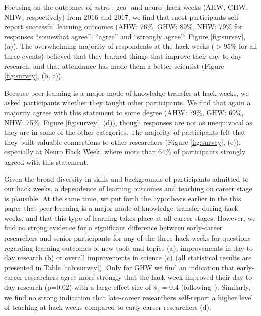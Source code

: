 Focusing on the outcomes of astro-, geo- and neuro- hack weeks (AHW, GHW, NHW, respectively) from 2016 and 2017, we find that most participants self-report successful learning outcomes (AHW: 76\%, GHW: 89\%, NHW: 79\% for responses ``somewhat agree'', ``agree'' and ``strongly agree''; Figure \ref{fig:survey}, (a)).
The overwhelming majority of respondents at the hack weeks ($>95\%$ for all three events) believed that they learned things that improve their day-to-day research, and that attendance has made them a better scientist (Figure \ref{fig:survey}, (b, c)).

Because peer learning is a major mode of knowledge transfer at hack weeks, we asked participants whether they taught other participants.
We find that again a majority agrees with this statement to some degree (AHW: 79\%, GHW: 69\%, NHW: 75\%; Figure \ref{fig:survey}, (d)), though responses are not as unequivocal as they are in some of the other categories.
The majority of participants felt that they built valuable connections to other researchers (Figure \ref{fig:survey}, (e)), especially at Neuro Hack Week, where more than 64\% of participants strongly agreed with this statement. 

Given the broad diversity in skills and backgrounds of participants admitted to our hack weeks, a dependence of learning outcomes and teaching on career stage is plausible. At the same time, we put forth the hypothesis earlier in the this paper that peer learning is a major mode of knowledge transfer during hack weeks, and that this type of learning takes place at all career stages. However, we find no strong evidence for a significant difference between early-career researchers and senior participants for any of the three hack weeks for questions regarding learning outcomes of new tools and topics (a), improvements in day-to-day research (b) or overall improvements in science (c) (all statistical results are presented in Table \ref{tab:survey}). Only for GHW we find an indication that early-career researchers agree more strongly that the hack week improved their day-to-day research (p=0.02) with a large effect size of $\phi_c = 0.4$ (following~\citep{cohen1988}). 
Similarly, we find no strong indication that late-career researchers self-report a higher level of teaching at hack weeks compared to early-career researchers (d).

